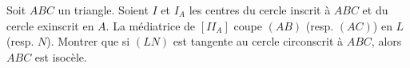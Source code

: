 Soit $ABC$ un triangle. Soient $I$ et $I_A$ les centres du cercle inscrit à $ABC$ et du cercle exinscrit en $A$. La médiatrice de $[II_A]$ coupe $(AB)$ (resp. $(AC)$) en $L$ (resp. $N$). Montrer que si $(LN)$ est tangente au cercle circonscrit à $ABC$, alors $ABC$ est isocèle.
